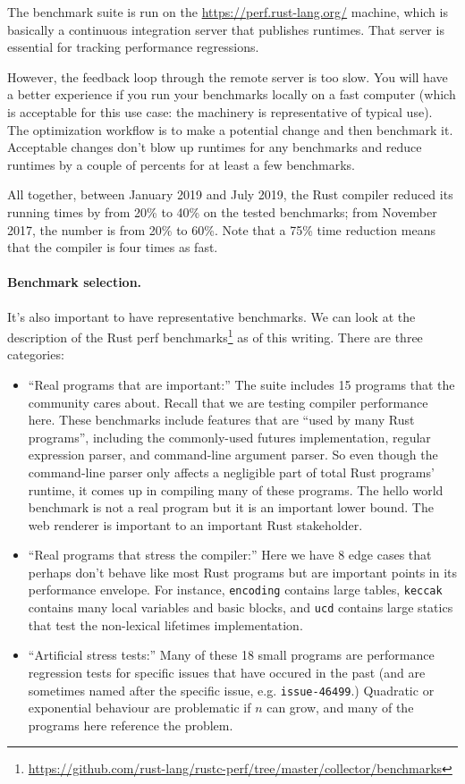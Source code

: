 The benchmark suite is run on the \url{https://perf.rust-lang.org/} machine, which is basically
a continuous integration server that publishes runtimes. That server is essential for tracking performance regressions.

However, the feedback loop through the remote server is too slow. You
will have a better experience if you run your benchmarks locally on a
fast computer (which is acceptable for this use case: the machinery is
representative of typical use). The optimization workflow is to make a
potential change and then benchmark it. Acceptable changes don't blow
up runtimes for any benchmarks and reduce runtimes by a couple of
percents for at least a few benchmarks.

All together, between January 2019 and July 2019, the Rust compiler reduced
its running times by from 20\% to 40\% on the tested benchmarks; from November 2017,
the number is from 20\% to 60\%. Note that a 75\% time reduction means that the compiler
is four times as fast.

\paragraph{Benchmark selection.} It's also important to have representative
benchmarks. We can look at the description of the Rust perf benchmarks\footnote{\url{https://github.com/rust-lang/rustc-perf/tree/master/collector/benchmarks}}
as of this writing.
There are three categories:
\begin{itemize}
\item ``Real programs that are important:'' The suite includes 15 programs that the community cares about.
Recall that we are testing compiler performance here.  These
benchmarks include features that are ``used by many Rust programs'',
including the commonly-used futures implementation, regular expression
parser, and command-line argument parser.  So even though the
command-line parser only affects a negligible part of total Rust
programs' runtime, it comes up in compiling many of these programs.
The hello world benchmark is not a real program but it is an
important lower bound. The web renderer is important to an important Rust stakeholder.
\item ``Real programs that stress the compiler:'' Here we have 8 edge cases
that perhaps don't behave like most Rust programs but are important points in its performance
envelope. For instance, \texttt{encoding} contains large tables, \texttt{keccak} contains many local variables
and basic blocks, and \texttt{ucd} contains large statics that test the non-lexical lifetimes implementation.
\item ``Artificial stress tests:'' Many of these 18 small programs are performance regression tests for specific issues that
have occured in the past (and are sometimes named after the specific issue, e.g. \texttt{issue-46499}.)
Quadratic or exponential behaviour are problematic if $n$ can grow, and many of the programs here
reference the problem.
\end{itemize}

